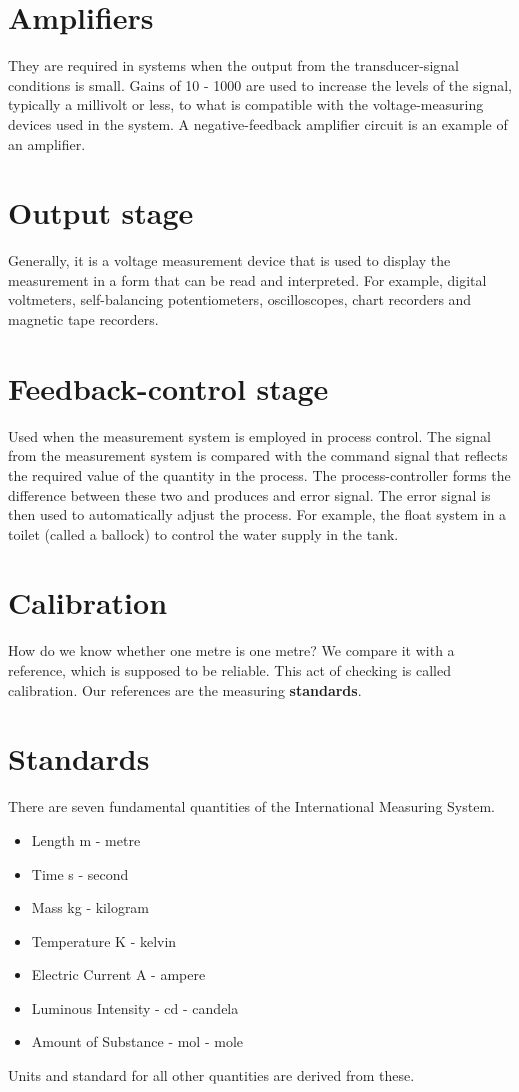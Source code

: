 \section{Amplifiers}
They are required in systems when the output from the transducer-signal conditions is small. Gains of 10 - 1000 are used to increase the levels of the signal, typically a millivolt or less, to what is compatible with the voltage-measuring devices used in the system. A negative-feedback amplifier circuit is an example of an amplifier.
\section{Output stage}
Generally, it is a voltage measurement device that is used to display the measurement in a form that can be read and interpreted. For example, digital voltmeters, self-balancing potentiometers, oscilloscopes, chart recorders and magnetic tape recorders.
\section{Feedback-control stage}
Used when the measurement system is employed in process control. The signal from the measurement system is compared with the command signal that reflects the required value of the quantity in the process. The process-controller forms the difference between these two and produces and error signal. The error signal is then used to automatically adjust the process. For example, the float system in a toilet (called a ballock) to control the water supply in the tank.
\section{Calibration}
How do we know whether one metre is one metre? We compare it with a reference, which is supposed to be reliable. This act of checking is called calibration. Our references are the measuring \textbf{standards}.
\section{Standards}
There are seven fundamental quantities of the International Measuring System.
\begin{itemize}
  \item Length \si{\m} - metre
  \item Time \si{\second} - second
  \item Mass \si{\kg} - kilogram
  \item Temperature \si{\kelvin} - kelvin
  \item Electric Current \si{\ampere} - ampere
  \item Luminous Intensity - \si{\candela} - candela
  \item Amount of Substance - \si{\mol} - mole
\end{itemize}
Units and standard for all other quantities are derived from these.

